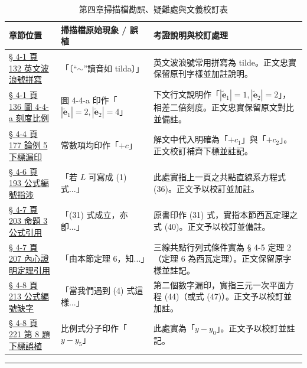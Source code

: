 \documentclass[a4paper,12pt,twoside]{article}
\begin{document}
\begin{table}[H]
\centering
\small
\renewcommand{\arraystretch}{1.35}
\begin{tabularx}{\textwidth}{|p{3.2cm}|p{3.8cm}|X|}
\hline
\textbf{章節位置} & \textbf{掃描檔原始現象 / 誤植} & \textbf{考證說明與校訂處理} \\ \hline

\hyperref[note:b3s-ch4-p132-tilde-pronounce]{§ 4-1 頁 132 英文波浪號拼寫} & 
「〔“$\sim$”讀音如 tilda〕」 & 
英文波浪號常用拼寫為 tilde。正文忠實保留原刊字樣並加註說明。 \\ \hline

\hyperref[note:b3s-ch4-p136-fig4-4-a-scale]{§ 4-1 頁 136 圖 4-4-a 刻度比例} & 
圖 4-4-a 印作「$|\tilde{\mathbf{e}}_1|=2, |\tilde{\mathbf{e}}_2|=4$」 & 
下文行文說明作「$|\tilde{\mathbf{e}}_1|=1, |\tilde{\mathbf{e}}_2|=2$」，相差二倍刻度。正文忠實保留原文對比並備註。 \\ \hline

\hyperref[note:b3s-ch4-p177-l1-l2-subscripts]{§ 4-4 頁 177 論例 5 下標漏印} & 
常數項均印作「$+c$」 & 
解文中代入明確為「$+c_1$」與「$+c_2$」。正文校訂補齊下標並註記。 \\ \hline

\hyperref[note:b3s-ch4-p193-formula-ref]{§ 4-6 頁 193 公式編號指涉} & 
「若 $L$ 可寫成 (1) 式...」 & 
此處實指上一頁之共點直線系方程式 (36)。正文予以校訂並加註。 \\ \hline

\hyperref[note:b3s-ch4-p203-ceva-ref]{§ 4-7 頁 203 命題 3 公式引用} & 
「(31) 式成立，亦卽...」 & 
原書印作 (31) 式，實指本節西瓦定理之式 (40)。正文予以校訂並備註。 \\ \hline

\hyperref[note:b3s-ch4-p207-theorem-ref]{§ 4-7 頁 207 內心證明定理引用} & 
「由本節定理 6，知...」 & 
三線共點行列式條件實為 § 4-5 定理 2（定理 6 為西瓦定理）。正文保留原字樣並註記。 \\ \hline

\hyperref[note:b3s-ch4-p213-equation-ref]{§ 4-8 頁 213 公式編號缺字} & 
「當我們遇到 (4) 式這樣...」 & 
第二個數字漏印，實指三元一次平面方程 (44)（或式 (47)）。正文予以校訂並加註。 \\ \hline

\hyperref[note:b3s-ch4-p221-subscript-typo]{§ 4-8 頁 221 第 8 題下標誤植} & 
比例式分子印作「$y - y_5$」 & 
此處實為「$y - y_0$」。正文予以校訂並註記。 \\ \hline
\end{tabularx}
\caption{第四章掃描檔勘誤、疑難處與文義校訂表}
\label{tab:errata_b3_ch4}
\end{table}

\vspace{1em}
\hrule
\vspace{1em}

\tableofcontents
\newpage

\setcounter{section}{3}

\end{document}
